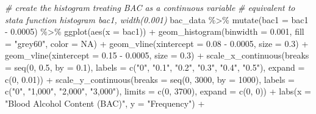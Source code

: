 \documentclass[
  11pt,
]{article}
\newenvironment{Shaded}{\begin{snugshade}}{\end{snugshade}}
\newcommand{\AttributeTok}[1]{\textcolor[rgb]{0.77,0.63,0.00}{#1}}
\newcommand{\CommentTok}[1]{\textcolor[rgb]{0.56,0.35,0.01}{\textit{#1}}}
\newcommand{\ConstantTok}[1]{\textcolor[rgb]{0.00,0.00,0.00}{#1}}
\newcommand{\DecValTok}[1]{\textcolor[rgb]{0.00,0.00,0.81}{#1}}
\newcommand{\FloatTok}[1]{\textcolor[rgb]{0.00,0.00,0.81}{#1}}
\newcommand{\FunctionTok}[1]{\textcolor[rgb]{0.00,0.00,0.00}{#1}}
\newcommand{\NormalTok}[1]{#1}
\newcommand{\SpecialCharTok}[1]{\textcolor[rgb]{0.00,0.00,0.00}{#1}}
\newcommand{\StringTok}[1]{\textcolor[rgb]{0.31,0.60,0.02}{#1}}
\begin{document}
\begin{Shaded}
\begin{Highlighting}[]
\CommentTok{\# create the histogram treating BAC as a continuous variable}
\CommentTok{\# equivalent to stata function histogram bac1, width(0.001)}
\NormalTok{bac\_data }\SpecialCharTok{\%\textgreater{}\%} 
  \FunctionTok{mutate}\NormalTok{(}\AttributeTok{bac1 =}\NormalTok{ bac1 }\SpecialCharTok{{-}} \FloatTok{0.0005}\NormalTok{) }\SpecialCharTok{\%\textgreater{}\%} 
  \FunctionTok{ggplot}\NormalTok{(}\FunctionTok{aes}\NormalTok{(}\AttributeTok{x =}\NormalTok{ bac1)) }\SpecialCharTok{+}
  \FunctionTok{geom\_histogram}\NormalTok{(}\AttributeTok{binwidth =} \FloatTok{0.001}\NormalTok{, }\AttributeTok{fill =} \StringTok{"grey60"}\NormalTok{, }\AttributeTok{color =} \ConstantTok{NA}\NormalTok{) }\SpecialCharTok{+}
  \FunctionTok{geom\_vline}\NormalTok{(}\AttributeTok{xintercept =} \FloatTok{0.08} \SpecialCharTok{{-}} \FloatTok{0.0005}\NormalTok{, }\AttributeTok{size =} \FloatTok{0.3}\NormalTok{) }\SpecialCharTok{+}
  \FunctionTok{geom\_vline}\NormalTok{(}\AttributeTok{xintercept =} \FloatTok{0.15} \SpecialCharTok{{-}} \FloatTok{0.0005}\NormalTok{, }\AttributeTok{size =} \FloatTok{0.3}\NormalTok{) }\SpecialCharTok{+}
  \FunctionTok{scale\_x\_continuous}\NormalTok{(}\AttributeTok{breaks =} \FunctionTok{seq}\NormalTok{(}\DecValTok{0}\NormalTok{, }\FloatTok{0.5}\NormalTok{, }\AttributeTok{by =} \FloatTok{0.1}\NormalTok{), }
                     \AttributeTok{labels =} \FunctionTok{c}\NormalTok{(}\StringTok{"0"}\NormalTok{, }\StringTok{"0.1"}\NormalTok{, }\StringTok{"0.2"}\NormalTok{, }\StringTok{"0.3"}\NormalTok{, }\StringTok{"0.4"}\NormalTok{, }\StringTok{"0.5"}\NormalTok{),}
                     \AttributeTok{expand =} \FunctionTok{c}\NormalTok{(}\DecValTok{0}\NormalTok{, }\FloatTok{0.01}\NormalTok{)) }\SpecialCharTok{+}
  \FunctionTok{scale\_y\_continuous}\NormalTok{(}\AttributeTok{breaks =} \FunctionTok{seq}\NormalTok{(}\DecValTok{0}\NormalTok{, }\DecValTok{3000}\NormalTok{, }\AttributeTok{by =} \DecValTok{1000}\NormalTok{),}
                     \AttributeTok{labels =} \FunctionTok{c}\NormalTok{(}\StringTok{"0"}\NormalTok{, }\StringTok{"1,000"}\NormalTok{, }\StringTok{"2,000"}\NormalTok{, }\StringTok{"3,000"}\NormalTok{),}
                     \AttributeTok{limits =} \FunctionTok{c}\NormalTok{(}\DecValTok{0}\NormalTok{, }\DecValTok{3700}\NormalTok{),}
                     \AttributeTok{expand =} \FunctionTok{c}\NormalTok{(}\DecValTok{0}\NormalTok{, }\DecValTok{0}\NormalTok{)) }\SpecialCharTok{+}
  \FunctionTok{labs}\NormalTok{(}\AttributeTok{x =} \StringTok{"Blood Alcohol Content (BAC)"}\NormalTok{, }\AttributeTok{y =} \StringTok{"Frequency"}\NormalTok{) }\SpecialCharTok{+}

\end{Highlighting}
\end{Shaded}
\end{document}
